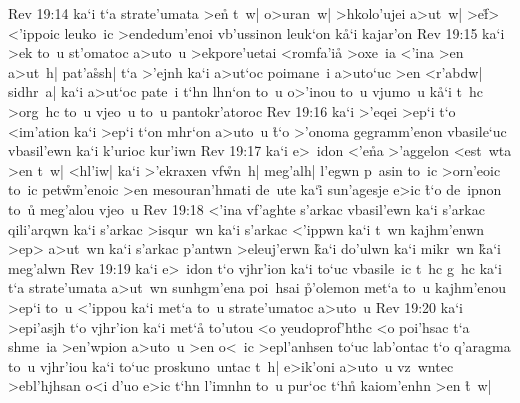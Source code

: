 \vs Rev 19:14
ka`i
t`a
strate'umata
>e\r{n}
t~w|
o>uran~w|
>hkolo'ujei
a>ut~w|
>e\r{f}>
<'ippoic
leuko~ic
>endedum'enoi
vb'ussinon
leuk`on
k\r{a}`i
kajar'on\bibvsend
\vs Rev 19:15
ka`i
>ek
to~u
st'omatoc
a>uto~u
>ekpore'uetai
<romfa'i\r{a}
>oxe~ia
<'ina
>en
a>ut~h|
pat'a\r{s}sh|
t`a
>'ejnh
ka`i
a>ut`oc
poimane~i
a>uto`uc
>en
<r'abdw|
sidhr~a|
ka`i
a>ut`oc
pate~i
t`hn
lhn`on
to~u
o>'inou
to~u
vjumo~u
k\r{a}`i
t~hc
>org~hc
to~u
vjeo~u
to~u
pantokr'atoroc\bibvsend
\vs Rev 19:16
ka`i
>'eqei
>ep`i
t`o
<im'ation
ka`i
>ep`i
t`on
mhr`on
a>uto~u
\r{t}`o
>'onoma
gegramm'enon
vbasile`uc
vbasil'ewn
ka`i
k'urioc
kur'iwn\bibvsend
\vs Rev 19:17
ka`i
e>~idon
<'e\r{n}a
>'aggelon
<est~wta
>en
t~w|
<hl'iw|
ka`i
>'ekraxen
vf\r{w}n~h|
meg'alh|
l'egwn
p~asin
to~ic
>orn'eoic
to~ic
pet\r{w}m'enoic
>en
mesouran'hmati
de~ute
ka`i\r{}
sun'agesje
e>ic
\r{t}`o
de~ipnon
to~u\r{}
meg'alou
vjeo~u\bibvsend
\vs Rev 19:18
<'ina
vf'aghte
s'arkac
vbasil'ewn
ka`i
s'arkac
qili'arqwn
ka`i
s'arkac
>isqur~wn
ka`i
s'arkac
<'ippwn
ka`i
t~wn
kajhm'enwn
>ep>
a>ut~wn
ka`i
s'arkac
p'antwn
>eleuj'erwn
\r{k}a`i
do'ulwn
ka`i
mikr~wn
\r{k}a`i
meg'alwn\bibvsend
\vs Rev 19:19
ka`i
e>~idon
t`o
vjhr'ion
ka`i
to`uc
vbasile~ic
t~hc
g~hc
ka`i
t`a
strate'umata
a>ut~wn
sunhgm'ena
poi~hsai
\r{p}'olemon
met`a
to~u
kajhm'enou
>ep`i
to~u
<'ippou
ka`i
met`a
to~u
strate'umatoc
a>uto~u\bibvsend
\vs Rev 19:20
ka`i
>epi'asjh
t`o
vjhr'ion
ka`i
met`a\r{}
to'utou
<o
yeudoprof'hthc
<o
poi'hsac
t`a
shme~ia
>en'wpion
a>uto~u
>en
o<~ic
>epl'anhsen
to`uc
lab'ontac
t`o
q'aragma
to~u
vjhr'iou
ka`i
to`uc
proskuno~untac
t~h|
e>ik'oni
a>uto~u
vz~wntec
>ebl'hjhsan
o<i
d'uo
e>ic
t`hn
l'imnhn
to~u
pur`oc
t`hn\r{}
kaiom'enhn
>en
\r{t}~w|
